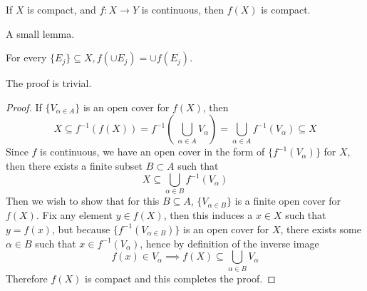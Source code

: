 \documentclass[../../main.tex]{subfiles}
\begin{document}
\begin{wts}
If $X$ is compact, and $f:X\to Y$ is continuous, then $f(X)$ is compact.
\end{wts}
A small lemma.
\begin{lemma}
For every $\{E_j\}\subseteq X, f(\cup E_j)=\cup f(E_j)$.
\end{lemma}
The proof is trivial.

\begin{proof}
If $\{V_{\alpha\in A}\}$ is an open cover for $f(X)$, then 
\[
X\subseteq f^{-1}(f(X))=f^{-1}\left(\:\bigcup_{\alpha\in A} V_\alpha\right) = \bigcup_{\alpha\in A}f^{-1}(V_\alpha)\subseteq X
\]
Since $f$ is continuous, we have an open cover in the form of $\{f^{-1}(V_\alpha)\}$ for $X$, then there exists a finite subset $B\subset A$ such that
\[
X\subseteq\bigcup_{\alpha\in B}f^{-1}(V_\alpha)
\]
Then we wish to show that for this $B\subseteq A$, $\{V_{\alpha\in B}\}$ is a finite open cover for $f(X)$. Fix any element $y\in f(X)$, then this induces a $x\in X$ such that $y=f(x)$, but because $\{f^{-1}(V_{\alpha\in B})\}$ is an open cover for $X$, there exists some $\alpha\in B$ such that $x\in f^{-1}(V_\alpha)$, hence by definition of the inverse image
\[
f(x)\in V_\alpha\implies f(X)\subseteq \bigcup_{\alpha\in B}V_\alpha
\]
Therefore $f(X)$ is compact and this completes the proof.
\end{proof}
\end{document}
